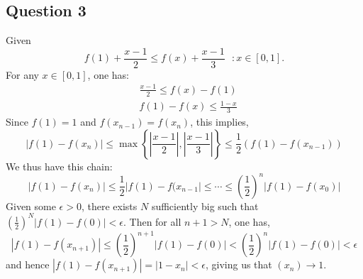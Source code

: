 \documentclass{article}
\begin{document}
\subsection*{Question 3}
Given
\begin{equation*}
    f(1) + \frac{x-1}{2} \leq f(x) + \frac{x-1}{3} \ \ \ : x \in [0, 1].
\end{equation*}
For any $x \in [0,1]$, one has:
\begin{align*}
    &\frac{x-1}{2} \leq f(x) - f(1)  \\
    &f(1) - f(x) \leq \frac{1-x}{3}
\end{align*}
Since $f(1)=1$ and $f(x_{n-1})=f(x_n)$, this implies,
\begin{equation*}
    |f(1)-f(x_n)| \leq \max\left\{\left| \frac{x-1}{2} \right|, \left| \frac{x-1}{3} \right|\right\} \leq \frac{1}{2} (f(1) -f(x_{n-1}))
\end{equation*}
We thus have this chain:
\begin{equation*}
    |f(1)-f(x_n)| \leq \frac{1}{2} |f(1)-f(x_{n-1}| \leq \cdots \leq \left( \frac{1}{2} \right)^n |f(1)-f(x_0)|
\end{equation*}
Given some $\epsilon>0$, there exists $N$ sufficiently big such that $\left( \frac{1}{2}\right)^N |f(1)-f(0)| < \epsilon$.
Then for all $n+1>N$, one has,
\begin{equation*}
    |f(1)-f(x_{n+1})| \leq \left(\frac{1}{2}\right)^{n+1} |f(1)-f(0)| < \left(\frac{1}{2}\right)^{n} |f(1)-f(0)| < \epsilon
\end{equation*}
and hence $|f(1)-f(x_{n+1})|=|1-x_n|<\epsilon$, giving us that $(x_n) \to 1$.
\end{document}
